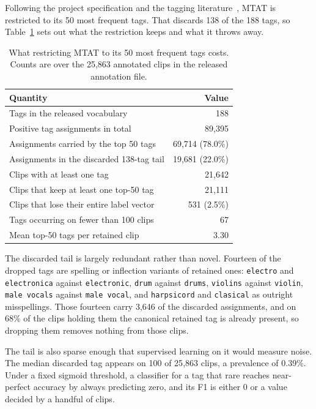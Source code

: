 \documentclass{article}
\begin{document}
Following the project specification and the tagging
literature~\cite{choi2016autotagging,won2020evaluation}, MTAT is restricted to
its 50 most frequent tags. That discards 138 of the 188 tags, so
Table~\ref{tab:vocab} sets out what the restriction keeps and what it throws
away.

\begin{table}[t]
  \centering
  \caption{What restricting MTAT to its 50 most frequent tags costs. Counts are
  over the 25{,}863 annotated clips in the released annotation file.}
  \label{tab:vocab}
  \begin{tabular}{lr}
    \toprule
    Quantity & Value \\
    \midrule
    Tags in the released vocabulary & 188 \\
    Positive tag assignments in total & 89{,}395 \\
    Assignments carried by the top 50 tags & 69{,}714 (78.0\%) \\
    Assignments in the discarded 138-tag tail & 19{,}681 (22.0\%) \\
    Clips with at least one tag & 21{,}642 \\
    Clips that keep at least one top-50 tag & 21{,}111 \\
    Clips that lose their entire label vector & 531 (2.5\%) \\
    Tags occurring on fewer than 100 clips & 67 \\
    Mean top-50 tags per retained clip & 3.30 \\
    \bottomrule
  \end{tabular}
\end{table}

The discarded tail is largely redundant rather than novel. Fourteen of the
dropped tags are spelling or inflection variants of retained ones:
\texttt{electro} and \texttt{electronica} against \texttt{electronic},
\texttt{drum} against \texttt{drums}, \texttt{violins} against \texttt{violin},
\texttt{male vocals} against \texttt{male vocal}, and \texttt{harpsicord} and
\texttt{clasical} as outright misspellings. Those fourteen carry 3{,}646 of the
discarded assignments, and on 68\% of the clips holding them the canonical
retained tag is already present, so dropping them removes nothing from those
clips.

The tail is also sparse enough that supervised learning on it would measure
noise. The median discarded tag appears on 100 of 25{,}863 clips, a prevalence
of 0.39\%. Under a fixed sigmoid threshold, a classifier for a tag that rare
reaches near-perfect accuracy by always predicting zero, and its F1 is either 0
or a value decided by a handful of clips.
\end{document}
